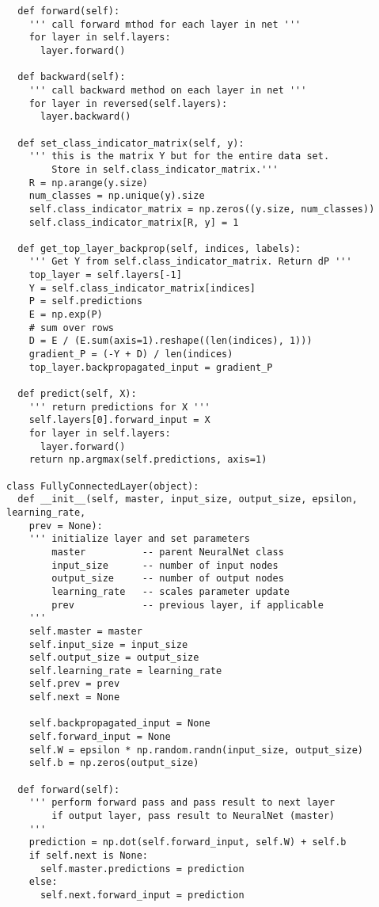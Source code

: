 \begin{verbatim}
  def forward(self):
    ''' call forward mthod for each layer in net '''
    for layer in self.layers:
      layer.forward()

  def backward(self):
    ''' call backward method on each layer in net '''
    for layer in reversed(self.layers):
      layer.backward()
    
  def set_class_indicator_matrix(self, y):
    ''' this is the matrix Y but for the entire data set.
        Store in self.class_indicator_matrix.'''
    R = np.arange(y.size)
    num_classes = np.unique(y).size
    self.class_indicator_matrix = np.zeros((y.size, num_classes))
    self.class_indicator_matrix[R, y] = 1
    
  def get_top_layer_backprop(self, indices, labels):
    ''' Get Y from self.class_indicator_matrix. Return dP '''
    top_layer = self.layers[-1]
    Y = self.class_indicator_matrix[indices]
    P = self.predictions
    E = np.exp(P)
    # sum over rows
    D = E / (E.sum(axis=1).reshape((len(indices), 1)))
    gradient_P = (-Y + D) / len(indices)
    top_layer.backpropagated_input = gradient_P

  def predict(self, X):
    ''' return predictions for X '''
    self.layers[0].forward_input = X
    for layer in self.layers:
      layer.forward()
    return np.argmax(self.predictions, axis=1)

class FullyConnectedLayer(object):
  def __init__(self, master, input_size, output_size, epsilon, learning_rate,
    prev = None):
    ''' initialize layer and set parameters
        master          -- parent NeuralNet class
        input_size      -- number of input nodes
        output_size     -- number of output nodes
        learning_rate   -- scales parameter update
        prev            -- previous layer, if applicable
    '''
    self.master = master
    self.input_size = input_size
    self.output_size = output_size
    self.learning_rate = learning_rate
    self.prev = prev
    self.next = None

    self.backpropagated_input = None
    self.forward_input = None
    self.W = epsilon * np.random.randn(input_size, output_size)
    self.b = np.zeros(output_size)

  def forward(self):
    ''' perform forward pass and pass result to next layer
        if output layer, pass result to NeuralNet (master)
    '''
    prediction = np.dot(self.forward_input, self.W) + self.b
    if self.next is None:
      self.master.predictions = prediction
    else:
      self.next.forward_input = prediction
    

\end{verbatim}
